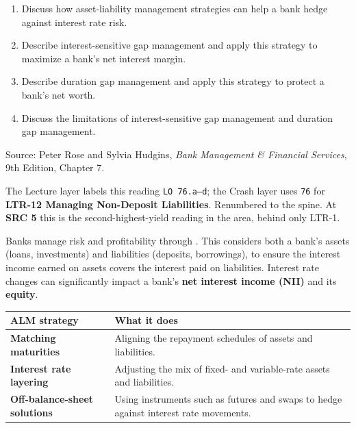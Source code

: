 
\begin{lrkeybox}
\begin{enumerate}[label=\textbf{\alph*.}]
\item Discuss how asset-liability management strategies can help a bank hedge against interest rate risk.
\item Describe interest-sensitive gap management and apply this strategy to maximize a bank's net interest margin.
\item Describe duration gap management and apply this strategy to protect a bank's net worth.
\item Discuss the limitations of interest-sensitive gap management and duration gap management.
\end{enumerate}
{\footnotesize\color{FRMGrey}Source: Peter Rose and Sylvia Hudgins, \textit{Bank Management \& Financial Services}, 9th Edition, Chapter 7.}
\end{lrkeybox}

\begin{lrtrapbox}
The Lecture layer labels this reading \texttt{LO 76.a--d}; the Crash layer uses \texttt{76} for \textbf{LTR-12 Managing Non-Deposit Liabilities}. Renumbered to the spine. At \textbf{SRC 5} this is the second-highest-yield reading in the area, behind only LTR-1.
\end{lrtrapbox}


Banks manage risk and profitability through . This considers both a bank's assets (loans, investments) and liabilities (deposits, borrowings), to ensure the interest income earned on assets covers the interest paid on liabilities. Interest rate changes can significantly impact a bank's \textbf{net interest income (NII)} and its \textbf{equity}.

\begin{center}
\small
\begin{tabularx}{\textwidth}{@{}p{4.0cm} X@{}}
\toprule
\rowcolor{FRMSoft}\textbf{ALM strategy} & \textbf{What it does} \\
\midrule
\textbf{Matching maturities} & Aligning the repayment schedules of assets and liabilities. \\
\textbf{Interest rate layering} & Adjusting the mix of fixed- and variable-rate assets and liabilities. \\
\textbf{Off-balance-sheet solutions} & Using instruments such as futures and swaps to hedge against interest rate movements. \\
\bottomrule
\end{tabularx}
\end{center}

